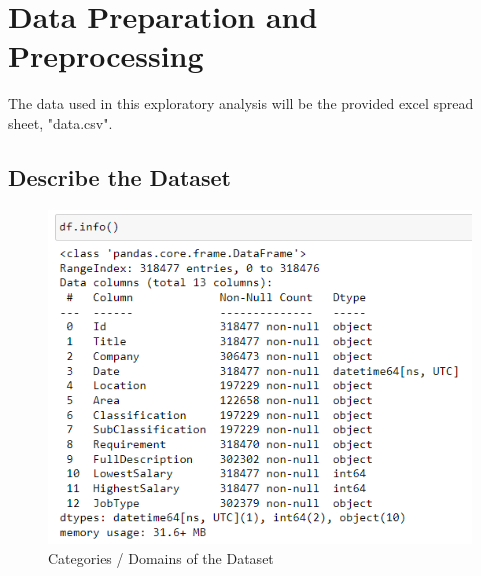 \documentclass[twoside, 12pt, a4paper]{article}
\begin{document}


\pagestyle{fancy}
\fancyfoot[C]{\thepage}
\fancyfoot[L,R]{}
\setcounter{page}{1}



\tableofcontents



\newpage
{}
\setcounter{page}{1}
\pagestyle{fancy}

\fancyfoot[LE,RO]{\thepage}
\fancyfoot[C]{}

\section{Data Preparation and Preprocessing}
The data used in this exploratory analysis will be the provided excel spread sheet, "data.csv". 
\subsection{Describe the Dataset}

\begin{figure}[h]
	\centering
	\includegraphics[scale = 0.65]{cats.png}
	\caption{Categories / Domains of the Dataset}
	\label{fig:cats}
\end{figure}
\end{document}
